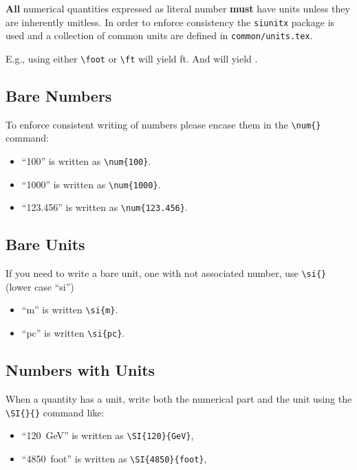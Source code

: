 \textbf{All} numerical quantities expressed as literal number
\textbf{must} have units unless they are inherently unitless.
In order to enforce consistency the \texttt{siunitx} package is used
and a collection of common units are defined in
\texttt{common/units.tex}.

E.g., using either \verb|\foot| or \verb|\ft| will yield ft. And \ktyr will yield \ktyr.

\subsection{Bare Numbers}

To enforce consistent writing of numbers please encase them in the
\verb|\num{}| command:

\begin{itemize}
\item ``\num{100}'' is written as \verb|\num{100}|.
\item ``\num{1000}'' is written as \verb|\num{1000}|.
\item ``\num{123.456}'' is written as \verb|\num{123.456}|.
\end{itemize}

\subsection{Bare Units}

If you need to write a bare unit, one with not associated number, use
\verb|\si{}| (lower case ``si'')

\begin{itemize}
\item ``\si{m}'' is written \verb|\si{m}|.
\item ``\si{pc}'' is written \verb|\si{pc}|.
\end{itemize}

\subsection{Numbers with Units}

When a quantity has a unit, write both the numerical part and the unit
using the \verb|\SI{}{}| command like:

\begin{itemize}
\item ``\SI{120}{GeV}'' is written as \verb|\SI{120}{GeV}|,
\item ``\SI{4850}{foot}'' is written as \verb|\SI{4850}{foot}|,
\end{itemize}


